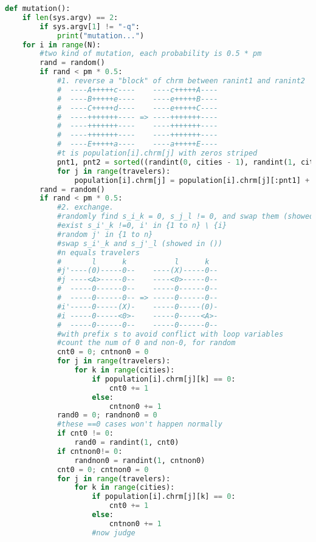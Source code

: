 \documentclass[UTF8,cs4size]{ctexart}
\begin{document}
\begin{lstlisting}[language=Python]
def mutation():
    if len(sys.argv) == 2:
        if sys.argv[1] != "-q":
            print("mutation...")
    for i in range(N):
        #two kind of mutation, each probability is 0.5 * pm
        rand = random()
        if rand < pm * 0.5:
            #1. reverse a "block" of chrm between ranint1 and ranint2
            #  ----A+++++c----    ----c+++++A----
            #  ----B+++++e----    ----e+++++B----
            #  ----C+++++d----    ----e+++++C----
            #  ----+++++++---- => ----+++++++----
            #  ----+++++++----    ----+++++++----
            #  ----+++++++----    ----+++++++----
            #  ----E+++++a----    ----a+++++E----
            #t is population[i].chrm[j] with zeros striped
            pnt1, pnt2 = sorted((randint(0, cities - 1), randint(1, cities - 1)))
            for j in range(travelers):
                population[i].chrm[j] = population[i].chrm[j][:pnt1] + population[i].chrm[j][pnt1:pnt2 + 1][::-1] + population[i].chrm[j][pnt2 + 1:]
        rand = random()
        if rand < pm * 0.5:
            #2. exchange.
            #randomly find s_i_k = 0, s_j_l != 0, and swap them (showed in <>)
            #exist s_i'_k !=0, i' in {1 to n} \ {i}
            #random j' in {1 to n}
            #swap s_i'_k and s_j'_l (showed in ())
            #n equals travelers
            #       l      k           l      k
            #j'----(0)-----0--    ----(X)-----0--
            #j ----<A>-----0--    ----<0>-----0--
            #  -----0------0--    -----0------0--
            #  -----0------0-- => -----0------0--
            #i'-----0-----(X)-    -----0-----(0)-
            #i -----0-----<0>-    -----0-----<A>-
            #  -----0------0--    -----0------0--
            #with prefix s to avoid conflict with loop variables
            #count the num of 0 and non-0, for random
            cnt0 = 0; cntnon0 = 0
            for j in range(travelers):
                for k in range(cities):
                    if population[i].chrm[j][k] == 0:
                        cnt0 += 1
                    else:
                        cntnon0 += 1
            rand0 = 0; randnon0 = 0
            #these ==0 cases won't happen normally
            if cnt0 != 0:
                rand0 = randint(1, cnt0)
            if cntnon0!= 0:
                randnon0 = randint(1, cntnon0)
            cnt0 = 0; cntnon0 = 0
            for j in range(travelers):
                for k in range(cities):
                    if population[i].chrm[j][k] == 0:
                        cnt0 += 1
                    else:
                        cntnon0 += 1
                    #now judge

\end{lstlisting}
\end{document}
